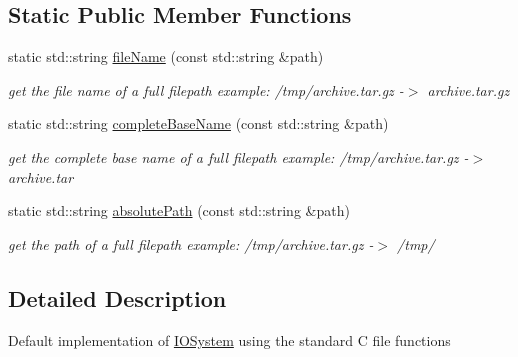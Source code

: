 \subsection*{Static Public Member Functions}
\begin{CompactItemize}
\item 
\hypertarget{class_assimp_1_1_default_i_o_system_a01ea34e60ed8a3920979b5b4e2927ee}{
static std::string \hyperlink{class_assimp_1_1_default_i_o_system_a01ea34e60ed8a3920979b5b4e2927ee}{fileName} (const std::string \&path)}
\label{class_assimp_1_1_default_i_o_system_a01ea34e60ed8a3920979b5b4e2927ee}

\begin{CompactList}\small\item\em get the file name of a full filepath example: /tmp/archive.tar.gz -$>$ archive.tar.gz \item\end{CompactList}\item 
\hypertarget{class_assimp_1_1_default_i_o_system_fa9e12ddf8f7aa1a33935309b917a142}{
static std::string \hyperlink{class_assimp_1_1_default_i_o_system_fa9e12ddf8f7aa1a33935309b917a142}{completeBaseName} (const std::string \&path)}
\label{class_assimp_1_1_default_i_o_system_fa9e12ddf8f7aa1a33935309b917a142}

\begin{CompactList}\small\item\em get the complete base name of a full filepath example: /tmp/archive.tar.gz -$>$ archive.tar \item\end{CompactList}\item 
\hypertarget{class_assimp_1_1_default_i_o_system_f95ec2cff042a580082d463613cfe407}{
static std::string \hyperlink{class_assimp_1_1_default_i_o_system_f95ec2cff042a580082d463613cfe407}{absolutePath} (const std::string \&path)}
\label{class_assimp_1_1_default_i_o_system_f95ec2cff042a580082d463613cfe407}

\begin{CompactList}\small\item\em get the path of a full filepath example: /tmp/archive.tar.gz -$>$ /tmp/ \item\end{CompactList}\end{CompactItemize}


\subsection{Detailed Description}
Default implementation of \hyperlink{class_assimp_1_1_i_o_system}{IOSystem} using the standard C file functions 

